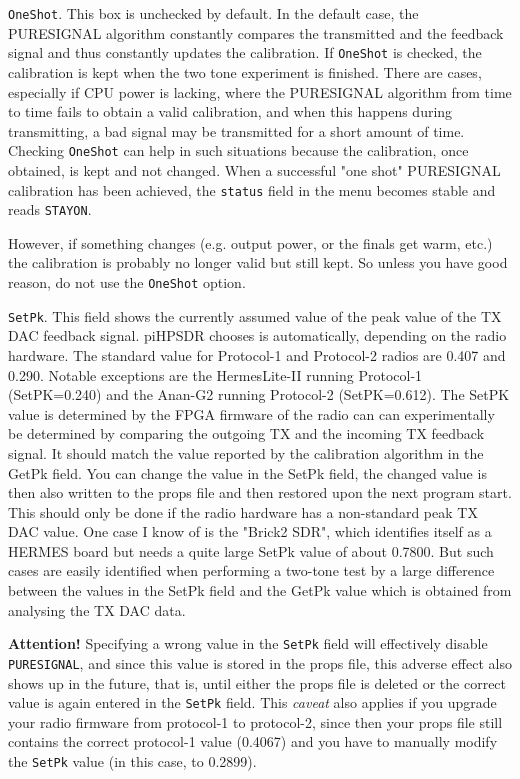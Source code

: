 \documentclass[12pt]{book}
\def\rett#1{\texttt{\color{red}#1}}
\def\bltt#1{\texttt{\color{blue}#1}}
\def\pH{pi\-HPSDR\xspace}
\begin{document}
\rett{OneShot}. This box is unchecked by default. In the default case, the PURESIGNAL
algorithm constantly compares the transmitted and the feedback signal and thus
constantly updates the calibration. If \rett{OneShot} is checked, the calibration
is kept when the two tone experiment is finished. There are cases, especially if
CPU power is lacking, where the PURESIGNAL algorithm from time to time fails to obtain
a valid calibration, and when this happens during transmitting, a bad signal may
be transmitted for a short amount of time. Checking \rett{OneShot} can help in such
situations because the calibration, once obtained, is kept and not changed.
When a successful "one shot" PURESIGNAL calibration has been achieved, the \bltt{status}
field in the menu becomes stable and reads \texttt{STAYON}.

However, if something changes (e.g. output power, or the finals get warm, etc.) the
calibration is probably no longer valid but still kept. So unless you have good reason,
do not use the \rett{OneShot} option.

\rett{SetPk}. This field shows the currently assumed value of the peak value of the TX DAC
feedback signal. \pH chooses is automatically, depending on the radio hardware.
The standard value for Protocol-1 and Protocol-2 radios are 0.407 and 0.290. Notable exceptions are
the HermesLite-II running Protocol-1 (SetPK=0.240) and the Anan-G2 running Protocol-2 (SetPK=0.612).
The SetPK value is determined by the FPGA firmware of the radio can can experimentally
be determined by comparing the outgoing TX and the incoming TX feedback signal.
It should match the value reported
by the calibration algorithm in the GetPk field. You can change the value in the SetPk
field, the changed value is then also written to the props file and then restored
upon the next program start. This should only be done if the radio hardware has
a non-standard peak TX DAC value. One case I  know of is the "Brick2 SDR", which identifies
itself as a HERMES board but needs a quite large SetPk value of about 0.7800. But such
cases are easily identified when performing a two-tone test by a large difference
between the values in the SetPk field and the GetPk value which is obtained from analysing
the TX DAC data.

\textbf{Attention!} Specifying a wrong value in the \rett{SetPk} field will effectively
disable \texttt{PURESIGNAL}, and since this value is stored in the props file, this
adverse effect also shows up in the future, that is, until either the props file is deleted
or the correct value is again entered in the \rett{SetPk} field. This \textit{caveat} also
applies if you upgrade your radio firmware from protocol-1 to protocol-2, since then your props
file still contains the correct protocol-1 value (0.4067) and you have
to manually modify the \rett{SetPk} value (in this case, to 0.2899).
\end{document}
